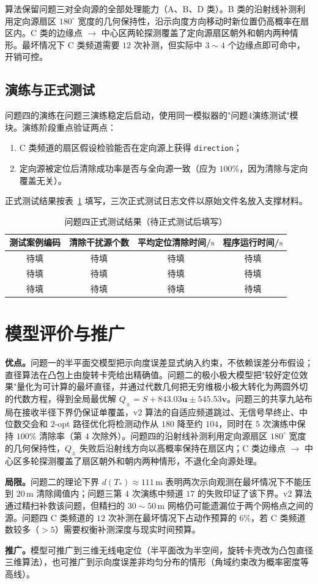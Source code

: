 \documentclass[12pt,a4paper]{ctexart}
\begin{document}
\noindent 算法保留问题三对全向源的全部处理能力（A、B、D 类）。B 类的沿射线补测利用定向源扇区 $180^\circ$ 宽度的几何保持性，沿示向度方向移动时新位置仍高概率在扇区内。C 类的边缘点 $\to$ 中心区两轮探测覆盖了定向源扇区朝外和朝内两种情形。最坏情况下 C 类频道需要 $12$ 次补测，但实际中 $3\sim4$ 个边缘点即可命中，开销可控。

\subsection{演练与正式测试}
\label{sec:q4-test}
问题四的演练在问题三演练稳定后启动，使用同一模拟器的"问题4演练测试"模块。演练阶段重点验证两点：
\begin{enumerate}
  \item C 类频道的扇区假设检验能否在定向源上获得 \texttt{direction}；
  \item 定向源被定位后清除成功率是否与全向源一致（应为 $100\%$，因为清除与定向覆盖无关）。
\end{enumerate}
正式测试结果按表~\ref{tab:formal-p4} 填写，三次正式测试日志文件以原始文件名放入支撑材料。

\begin{table}[H]
\centering
\caption{问题四正式测试结果（待正式测试后填写）}
\begin{tabular}{cccc}
\toprule
测试案例编码 & 清除干扰源个数 & 平均定位清除时间/$\mathrm{s}$ & 程序运行时间/$\mathrm{s}$ \\
\midrule
待填 & 待填 & 待填 & 待填 \\
待填 & 待填 & 待填 & 待填 \\
待填 & 待填 & 待填 & 待填 \\
\bottomrule
\end{tabular}
\label{tab:formal-p4}
\end{table}

\section{模型评价与推广}
\noindent\textbf{优点。}问题一的半平面交模型把示向度误差显式纳入约束，不依赖误差分布假设；直径算法在凸包上由旋转卡壳给出精确值。问题二的极小极大模型把"较好定位效果"量化为可计算的最坏直径，并通过代数几何把无穷维极小极大转化为两圆外切的代数方程，得到全局最优解 $Q_\pm=S+843.03\bm u\pm545.53\bm v$。问题三的共享九站布局在接收半径下界仍保证单覆盖，v2 算法的自适应频道跳过、无信号早终止、中位数交会和 $2$-opt 路径优化将检测动作从 $180$ 降至约 $104$，同时在 $5$ 次演练中保持 $100\%$ 清除率（第 $4$ 次除外）。问题四的沿射线补测利用定向源扇区 $180^\circ$ 宽度的几何保持性，$Q_\pm$ 失败后沿射线方向以高概率保持在扇区内；C 类边缘点 $\to$ 中心区多轮探测覆盖了扇区朝外和朝内两种情形，不退化全向源处理。

\noindent\textbf{局限。}问题二的理论下界 $d(T_*)\approx111\,\mathrm{m}$ 表明两次示向观测在最坏情况下不能压到 $20\,\mathrm{m}$ 清除阈值内；问题三第 $4$ 次演练中频道 $17$ 的失败印证了该下界。v2 算法通过精扫补救该问题，但精扫的 $30\sim50\,\mathrm{m}$ 网格仍可能遗漏位于两个网格点之间的源。问题四 C 类频道的 $12$ 次补测在最坏情况下占动作预算的 $6\%$，若 C 类频道数较多（$>5$）需要权衡补测深度与现实时间预算。

\noindent\textbf{推广。}模型可推广到三维无线电定位（半平面改为半空间，旋转卡壳改为凸包直径三维算法），也可推广到示向度误差非均匀分布的情形（角域约束改为概率密度等高线）。
\end{document}
